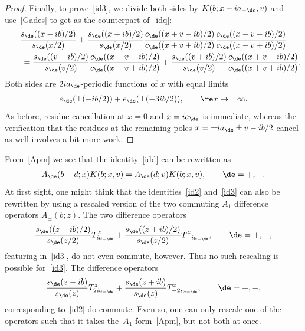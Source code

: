 \documentclass[pdftex]{sigma}
\numberwithin{equation}{section}
\begin{document}
\begin{proof}
Finally, to prove~\eqref{id3}, we divide both sides by
$K(b;x-ia_{-\de},v)$ and use~\eqref{Gades} to get as the counterpart of~\eqref{idq}:
\begin{gather}
   \frac{s_{\de}((x-ib)/2)}{s_{\de}(x/2)}+\frac{s_{\de}((x+ib)/2)}{s_{\de}(x/2)}\frac{c_{\de}((x+ v-ib)/2)}{c_{\de}((x+ v+ib)/2)}\frac{c_{\de}((x- v-ib)/2)}{c_{\de}((x- v+ib)/2)}  \nonumber \\
\qquad{} = \frac{s_{\de}((v-ib)/2)}{s_{\de}(v/2)} \frac{c_{\de}((x-v-ib)/2)}{c_{\de}((x-v+ib)/2)} +   \frac{s_{\de}((v+ib)/2)}{s_{\de}(v/2)} \frac{c_{\de}((x+v-ib)/2)}{c_{\de}((x+v+ib)/2)}.
\end{gather}
Both sides are $2ia_{\de}$-periodic functions of $x$ with equal limits
\begin{gather}
e_{\de}(\pm (-ib/2))+e_{\de}(\pm (-3ib/2)),\qquad \re x \to\pm\infty.
\end{gather}
As before, residue cancellation at $x=0$ and $x=ia_{\de}$ is immediate, whereas the verif\/ication that the residues at the remaining poles $x=\pm ia_{\de} \pm v  -ib/2$ cancel as well involves a bit more work.
\end{proof}


From~\eqref{Apm} we see that the identity~\eqref{idd} can be rewritten as
\begin{gather}
A_{\de}(b-d;x)K(b;x,v)=A_{\de}(d;v)K(b;x,v),\qquad \de=+,-.
\end{gather}
At f\/irst sight, one might think that the identities~\eqref{id2} and~\eqref{id3} can also be rewritten by using a rescaled version of the two commuting $A_1$ dif\/ference operators $A_{\pm}(b;z)$. The two dif\/ference operators
\begin{gather}
\frac{s_{\de}((z-ib)/2)}{s_{\de}(z/2)}T^z_{ia_{-\de}} +
\frac{s_{\de}((z+ib)/2)}{s_{\de}(z/2)}T^z_{-ia_{-\de}},\qquad \de=+,-,
\end{gather}
featuring in~\eqref{id3}, do not even commute, however. Thus no such rescaling is possible for~\eqref{id3}. The dif\/ference operators
\begin{gather}
\frac{s_{\de}(z-ib)}{s_{\de}(z)}T^z_{2ia_{-\de}} +
\frac{s_{\de}(z+ib)}{s_{\de}(z)}T^z_{-2ia_{-\de}},\qquad \de=+,-,
\end{gather}
corresponding to~\eqref{id2} do commute. Even so, one can only rescale one of the operators such that it takes the~$A_1$ form~\eqref{Apm}, but not both at once.
\end{document}
